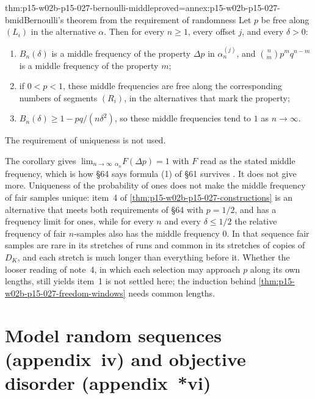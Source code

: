 \begin{hbcorollary}{thm:p15-w02b-p15-027-bernoulli-middle}{proved=annex:p15-w02b-p15-027-bmid}{Bernoulli's theorem from the requirement of randomness}
Let \(p\) be free along \((L_i)\) in the alternative \(\alpha\). Then for
every \(n\geq1\), every offset \(j\), and every \(\delta>0\):
\begin{enumerate}
\item \(B_n(\delta)\) is a middle frequency of the property \(\Delta p\)
  in \(\alpha_n^{(j)}\), and \(\binom nm p^mq^{n-m}\) is a middle
  frequency of the property \(m\);
\item if \(0<p<1\), these middle frequencies are free along the
  corresponding numbers of segments \((R_i)\), in the alternatives that
  mark the property;
\item \(B_n(\delta)\geq1-pq/(n\delta^2)\), so these middle frequencies
  tend to \(1\) as \(n\to\infty\).
\end{enumerate}
The requirement of uniqueness is not used.
\end{hbcorollary}

The corollary gives \(\lim_{n\to\infty}{}_{\alpha_n}F(\Delta p)=1\) with
\(F\) read as the stated middle frequency, which is how \S64 says formula
(1) of \S61 survives \parencite[\S64 and note~5]{Popper2002LogicDiscoveryUI}.
It does not give more. Uniqueness of the probability of ones does not
make the middle frequency of fair samples unique: item~4 of
\cref{thm:p15-w02b-p15-027-constructions} is an alternative that meets
both requirements of \S64 with \(p=1/2\), and has a frequency limit for
ones, while for every \(n\) and every \(\delta\leq1/2\) the relative
frequency of fair \(n\)-samples also has the middle frequency \(0\).
In that sequence fair samples are rare in its stretches of runs and
common in its stretches of copies of \(D_K\), and each stretch is much
longer than everything before it. Whether the looser reading of note~4, in which each
selection may approach \(p\) along its own lengths, still yields item~1
is not settled here; the induction behind
\cref{thm:p15-w02b-p15-027-freedom-windows} needs common lengths.

\section{Model random sequences (appendix~iv) and objective disorder (appendix~*vi)}
\label{sec:p15-w02b-p15-027-models}

